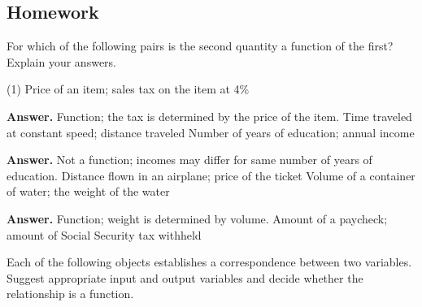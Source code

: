 \documentclass[10pt,]{book}
\theoremstyle{plain}
\theoremstyle{definition}
\theoremstyle{definition}
\theoremstyle{definition}
\theoremstyle{definition}
\numberwithin{equation}{part}
\begin{document}
\subsection[{Homework}]{Homework}\label{section-1-2-exercises}
\hypertarget{exercisegroup-7}{}\par\noindent For which of the following pairs is the second quantity a function of the first? Explain your answers.%
\begin{exercisegroup}(1)
\exercise[1.]\hypertarget{exercise-70}{}Price of an item; sales tax on the item at 4\%%
\par\smallskip
\noindent\textbf{Answer.}\hypertarget{answer-44}{}\quad
Function; the tax is determined by the price of the item.%
\exercise[2.]\hypertarget{exercise-71}{}Time traveled at constant speed; distance traveled%
\exercise[3.]\hypertarget{exercise-72}{}Number of years of education; annual income%
\par\smallskip
\noindent\textbf{Answer.}\hypertarget{answer-45}{}\quad
Not a function; incomes may differ for same number of years of education.%
\exercise[4.]\hypertarget{exercise-73}{}Distance flown in an airplane; price of the ticket%
\exercise[5.]\hypertarget{exercise-74}{}Volume of a container of water; the weight of the water%
\par\smallskip
\noindent\textbf{Answer.}\hypertarget{answer-46}{}\quad
Function; weight is determined by volume.%
\exercise[6.]\hypertarget{exercise-75}{}Amount of a paycheck; amount of Social Security tax withheld%
\end{exercisegroup}
\par\smallskip\noindent
\hypertarget{exercisegroup-8}{}\par\noindent Each of the following objects establishes a correspondence between two variables. Suggest appropriate input and output variables and decide whether the relationship is a function.%
\end{document}

